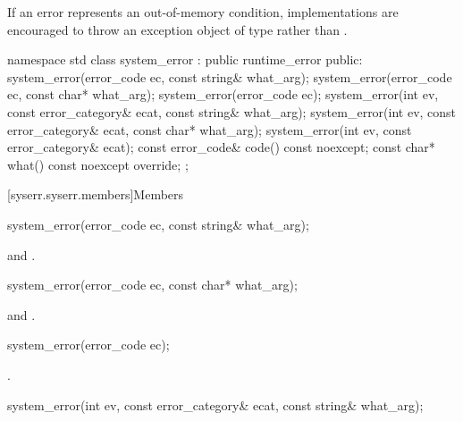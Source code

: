 \pnum
\begin{note}
If an error represents an out-of-memory condition, implementations are
encouraged to throw an exception object of type  rather
than .
\end{note}
%
\begin{codeblock}
namespace std {
  class system_error : public runtime_error {
  public:
    system_error(error_code ec, const string& what_arg);
    system_error(error_code ec, const char* what_arg);
    system_error(error_code ec);
    system_error(int ev, const error_category& ecat, const string& what_arg);
    system_error(int ev, const error_category& ecat, const char* what_arg);
    system_error(int ev, const error_category& ecat);
    const error_code& code() const noexcept;
    const char* what() const noexcept override;
  };
}
\end{codeblock}

[syserr.syserr.members]{Members}

%
\begin{itemdecl}
system_error(error_code ec, const string& what_arg);
\end{itemdecl}

\begin{itemdescr}
\pnum
\ensures
{} and\newline
{}.
\end{itemdescr}

%
\begin{itemdecl}
system_error(error_code ec, const char* what_arg);
\end{itemdecl}

\begin{itemdescr}
\pnum
\ensures
{} and
.
\end{itemdescr}

%
\begin{itemdecl}
system_error(error_code ec);
\end{itemdecl}

\begin{itemdescr}
\pnum
\ensures
{}.
\end{itemdescr}

%
\begin{itemdecl}
system_error(int ev, const error_category& ecat, const string& what_arg);
\end{itemdecl}

